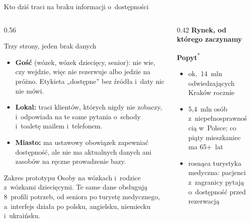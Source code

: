 \begin{frame}{Kto dziś traci na braku informacji o~dostępności}
  \begin{columns}[T,onlytextwidth]
    \begin{column}{0.56\textwidth}
      \begin{block}{Trzy strony, jeden brak danych}
        \footnotesize
        \begin{itemize}
          \item \textbf{Gość} (wózek, wózek dziecięcy, senior): nie wie, czy wejdzie, więc nie rezerwuje albo jedzie
                na próżno. Etykieta „dostępne” bez źródła i~daty nic nie mówi.
          \item \textbf{Lokal:} traci klientów, których nigdy nie zobaczy, i~odpowiada na te same pytania o~schody
                i~toaletę mailem i~telefonem.
          \item \textbf{Miasto:} ma ustawowy obowiązek zapewniać dostępność, ale nie ma aktualnych danych
                ani zasobów na ręczne prowadzenie bazy.
        \end{itemize}
      \end{block}
      \begin{exampleblock}{Zakres prototypu}
        \footnotesize
        Osoby na wózkach i~rodzice z~wózkami dziecięcymi. Te same dane obsługują 8~profili potrzeb,
        od seniora po turystę medycznego, a~interfejs działa po polsku, angielsku, niemiecku i~ukraińsku.
      \end{exampleblock}
    \end{column}
    \begin{column}{0.42\textwidth}
      \textbf{\small Rynek, od którego zaczynamy}\\
      \vspace{1mm}

      \hfill{}\hfill{}
      \vspace{2mm}

      \textbf{\small Popyt}\textsuperscript{*}
      \footnotesize
      \begin{itemize}
        \item ok.~14~mln odwiedzających Kraków rocznie
        \item 5,4~mln osób z~niepełnosprawnością w~Polsce; co piąty mieszkaniec ma 65+~lat
        \item rosnąca turystyka medyczna: pacjenci z~zagranicy pytają o~dostępność przed rezerwacją
      \end{itemize}
      \vspace{1mm}
    \end{column}
  \end{columns}


\end{frame}
